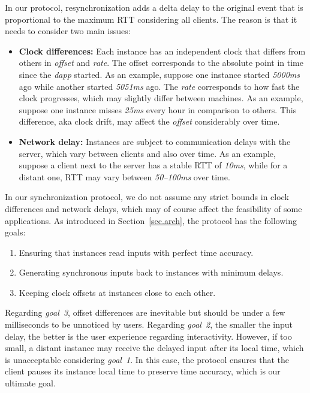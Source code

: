 \documentclass[sigplan,screen]{acmart}
\newcommand{\dapp}{\emph{dapp}\xspace}
\begin{document}
In our protocol, resynchronization adds a delta delay to the original event
that is proportional to the maximum RTT considering all clients.
The reason is that it needs to consider two main issues:
%
\begin{itemize}
\item \textbf{Clock differences:}
    Each instance has an independent clock that differs from others in
    \emph{offset} and \emph{rate}.
    The offset corresponds to the absolute point in time since the \dapp started.
    As an example, suppose one instance started \emph{5000ms} ago while another
    started \emph{5051ms} ago.
    The \emph{rate} corresponds to how fast the clock progresses, which may
    slightly differ between machines.
    As an example, suppose one instance misses \emph{25ms} every hour in
    comparison to others.
    This difference, aka clock drift, may affect the \emph{offset} considerably
    over time.
\item \textbf{Network delay:}
    Instances are subject to communication delays with the server, which vary
    between clients and also over time.
    As an example, suppose a client next to the server has a stable RTT of
    \emph{10ms}, while for a distant one, RTT may vary between \emph{50--100ms}
    over time.
\end{itemize}
%
In our synchronization protocol, we do not assume any strict bounds in clock
differences and network delays, which may of course affect the feasibility of
some applications.
%
As introduced in Section~\ref{sec.arch}, the protocol has the following goals:
%
\begin{enumerate}
\item Ensuring that instances read inputs with perfect time accuracy.
\item Generating synchronous inputs back to instances with minimum delays.
\item Keeping clock offsets at instances close to each other.
\end{enumerate}
%
Regarding \emph{goal~3}, offset differences are inevitable but should be under
a few milliseconds to be unnoticed by users.
Regarding \emph{goal~2}, the smaller the input delay, the better is the user
experience regarding interactivity.
However, if too small, a distant instance may receive the delayed input after
its local time, which is unacceptable considering \emph{goal~1}.
In this case, the protocol ensures that the client pauses its instance local
time to preserve time accuracy, which is our ultimate goal.
\end{document}
